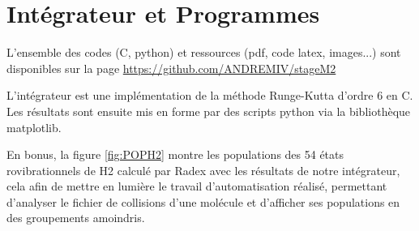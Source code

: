 \documentclass[10pt, a4paper]{report}
\numberwithin{equation}{subsection}
\begin{document}
\chapter{Intégrateur et Programmes}
L'ensemble des codes (C, python) et ressources (pdf, code latex, images...) sont disponibles sur la page \url{https://github.com/ANDREMIV/stageM2}

L'intégrateur est une implémentation de la méthode Runge-Kutta d'ordre 6 en C. Les résultats sont ensuite mis en forme par des scripts python via la bibliothèque matplotlib.

En bonus, la figure \ref{fig:POPH2} montre les populations des 54 états rovibrationnels de H2 calculé par Radex avec les résultats de notre intégrateur, cela afin de mettre en lumière le travail d'automatisation réalisé, permettant d'analyser le fichier de collisions d'une molécule et d'afficher ses populations en des groupements amoindris.
\end{document}
